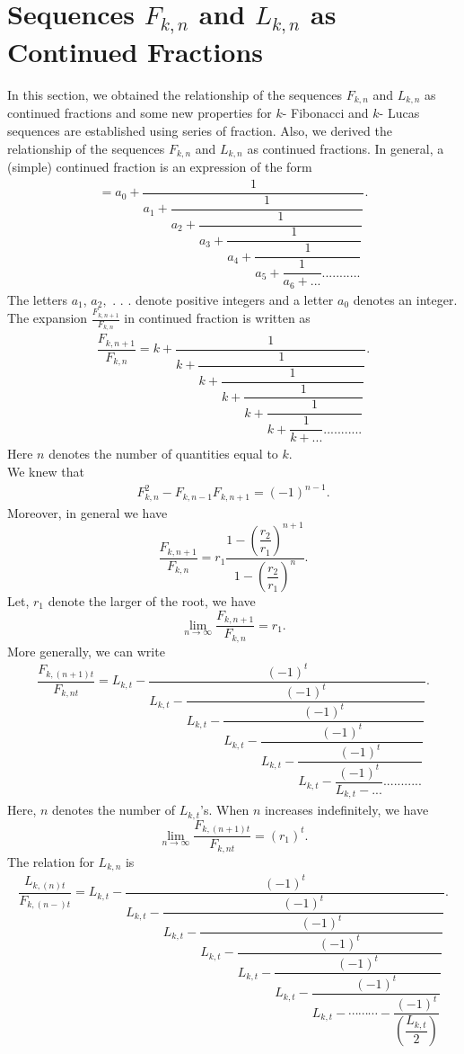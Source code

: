 \section{Sequences $F_{k,n}$ and $L_{k,n}$ as Continued Fractions}
In this section, we obtained the relationship of the sequences $F_{k,n}$ and $L_{k,n}$ as continued fractions and some new properties for $k$- Fibonacci and $k$- Lucas sequences are established using series of fraction. Also, we derived the relationship of the sequences $F_{k,n}$ and $L_{k,n}$ as continued fractions. In general, a (simple) continued fraction is an expression of the form
\begin{align*}
[a_0, a_1, .................,a_n] = a_0+\dfrac{1}{a_1+\dfrac{1}{a_2+\dfrac{1}{a_3+\dfrac{1}{a_4+\dfrac{1}{a_5+\dfrac{1}{a_6+...}...........}}}}}.
\end{align*}
The letters $a_1$, $a_2,$ . . . denote positive integers and a letter $a_0$ denotes an integer.
\noindent 
The expansion $\frac{F_{k,n+1}}{F_{k,n}}$ in continued fraction is written as
\begin{align*}
\dfrac{F_{k,n+1}}{F_{k,n}} = k+\dfrac{1}{k+\dfrac{1}{k+\dfrac{1}{k+\dfrac{1}{k+\dfrac{1}{k+\dfrac{1}{k+...}...........}}}}}.
\end{align*}
Here $n$ denotes the number of quantities equal to $k$.\\
We knew that
\begin{align*}
  F_{k,n}^2 - F_{k,n-1}F_{k,n+1}=(-1)^{n-1}.
 \end{align*}
Moreover, in general we have
$$\dfrac{F_{k,n+1}}{F_{k,n}}= r_1 \dfrac{1-(\dfrac{r_2}{r_1})^{n+1}}{1-(\dfrac{r_2}{r_1})^{n}}.$$
Let, $r_1$ denote the larger of the root, we have
$$\lim _{n \longrightarrow \infty}\dfrac{F_{k,n+1}}{F_{k,n}}= r_1.$$
More generally, we can write
\begin{align*}
\dfrac{F_{k,(n+1)t}}{F_{k,nt}} = L_{k,t}-\dfrac{(-1)^t}{L_{k,t}-\dfrac{(-1)^t}{L_{k,t}-\dfrac{(-1)^t}{L_{k,t}-\dfrac{(-1)^t}{L_{k,t}-\dfrac{(-1)^t}{L_{k,t}-\dfrac{(-1)^t}{L_{k,t}-...}...........}}}}}.
\end{align*}
Here, $n$ denotes the number of $L_{k,t}$'s. When $n$ increases indefinitely, we have
$$\lim _{n \longrightarrow \infty}\dfrac{F_{k,(n+1)t}}{F_{k,nt}}= (r_1)^t.$$
The  relation for $L_{k,n}$ is
\begin{align*}
\dfrac{L_{k,(n)t}}{F_{k,(n-)t}} = L_{k,t}-\dfrac{(-1)^t}{L_{k,t}-\dfrac{(-1)^t}{L_{k,t}-\dfrac{(-1)^t}{L_{k,t}-\dfrac{(-1)^t}{L_{k,t}-\dfrac{(-1)^t}{L_{k,t}-\dfrac{(-1)^t}{L_{k,t}-\cdots\cdots\cdots-\dfrac{(-1)^t}{(\dfrac{L_{k,t}}{2})}}}}}}}.
\end{align*}
